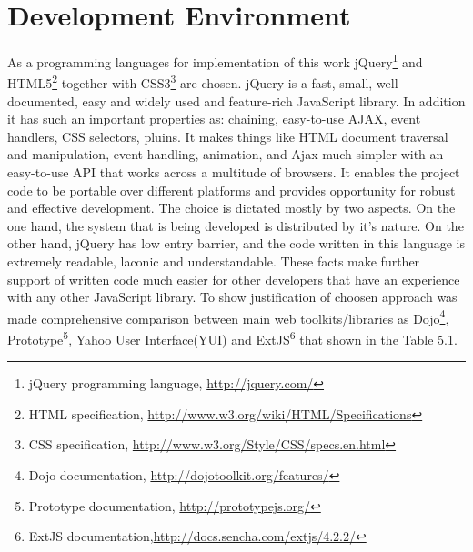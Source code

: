 \section{Development Environment}
	As a programming languages for implementation of this work jQuery\footnote{jQuery programming language, \url{http://jquery.com/}} and HTML5\footnote{HTML specification, \url{http://www.w3.org/wiki/HTML/Specifications}} together with CSS3\footnote{CSS specification, \url{http://www.w3.org/Style/CSS/specs.en.html}} are chosen. jQuery is a fast, small, well documented, easy and widely used and feature-rich JavaScript library. In addition it has such an important properties as: chaining, easy-to-use AJAX, event handlers, CSS selectors, pluins. It makes things like HTML document traversal and manipulation, event handling, animation, and Ajax much simpler with an easy-to-use API that works across a multitude of browsers. It enables the project code to be portable over different platforms and provides opportunity for robust and effective development. The choice is dictated mostly by two aspects. On the one hand, the system that is being developed is distributed by it’s nature. On the other hand, jQuery has low entry barrier, and the code written in this language is extremely readable, laconic and understandable. These facts make further support of written code much easier for other developers that have an experience with any other JavaScript library. 
	\newline
	To show justification of choosen approach was made comprehensive comparison between main web toolkits/libraries as Dojo\footnote{Dojo documentation, \url{http://dojotoolkit.org/features/}}, Prototype\footnote{Prototype documentation, \url{http://prototypejs.org/}}, Yahoo User Interface(YUI) and ExtJS\footnote{ExtJS documentation,\url{http://docs.sencha.com/extjs/4.2.2/}} that shown in the Table 5.1. 
